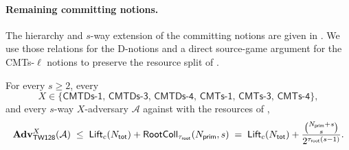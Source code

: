 \paragraph{Remaining committing notions.}
The hierarchy and $s$-way extension of the \cite{BH22} committing notions
are given in \cite[\S3, Figs.~4--5, and App.~A]{BH22}. We use those
relations for the D-notions and a direct source-game argument for the
CMTs-$\ell$ notions to preserve the resource split of
.

\begin{corollary}
\label{cor:committing-combined}
For every $s \geq 2$, every
\[
  X \in \bigl\{\mathsf{CMTDs\text{-}1},\, \mathsf{CMTDs\text{-}3},\,
              \mathsf{CMTDs\text{-}4},\, \mathsf{CMTs\text{-}1},\,
              \mathsf{CMTs\text{-}3},\, \mathsf{CMTs\text{-}4}\bigr\},
\]
and every $s$-way $X$-adversary $\mathcal{A}$ against \TW{} with the
resources of ,
\[
  \mathbf{Adv}^X_{\textsf{TW128}}(\mathcal{A})
  \;\leq\;
  \mathsf{Lift}_c(N_{\mathsf{tot}}) + \mathsf{RootColl}_{\tau_{\mathsf{root}}}(N_{\mathsf{prim}}, s)
  \;=\;
  \mathsf{Lift}_c(N_{\mathsf{tot}}) + \frac{\binom{N_{\mathsf{prim}} + s}{s}}{2^{\tau_{\mathsf{root}}(s-1)}}.
\]
\end{corollary}

